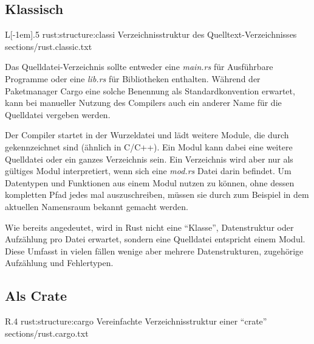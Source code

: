 \subsection{Klassisch}
\label{rust:structure:classic}
\begin{wrapfigure}{L}[-1em]{.5\textwidth}
	\rustcinclude
		{rust:structure:classi}
		{Verzeichnisstruktur des Quelltext-Verzeichnisses}
		{sections/rust.classic.txt}
\end{wrapfigure}

Das Quelldatei-Verzeichnis sollte entweder eine \textit{main.rs} für Ausführbare Programme oder eine \textit{lib.rs} für Bibliotheken enthalten.
Während der Paketmanager Cargo eine solche Benennung als Standardkonvention erwartet, kann bei manueller Nutzung des Compilers auch ein anderer Name für die Quelldatei vergeben werden.

Der Compiler startet in der Wurzeldatei und lädt weitere Module, die durch  gekennzeichnet sind (ähnlich  in C/C++).
Ein Modul kann dabei eine weitere Quelldatei oder ein ganzes Verzeichnis sein.
Ein Verzeichnis wird aber nur als gültiges Modul interpretiert, wenn sich eine \textit{mod.rs} Datei darin befindet.
Um Datentypen und Funktionen aus einem Modul nutzen zu können, ohne dessen kompletten Pfad jedes mal auszuschreiben, müssen sie durch zum Beispiel  in dem aktuellen Namensraum bekannt gemacht werden.

Wie bereits angedeutet, wird in Rust nicht eine \enquote{Klasse}, Datenstruktur oder Aufzählung pro Datei erwartet, sondern eine Quelldatei entspricht einem Modul.
Diese Umfasst in vielen fällen wenige aber mehrere Datenstrukturen, zugehörige Aufzählung und Fehlertypen.

\subsection{Als Crate}
\label{rust:structure:crate}

\begin{wrapfigure}{R}{.4\textwidth}
	\rustcincludeml
		{rust:structure:cargo}
		{Vereinfachte Verzeichnisstruktur einer \enquote{crate}}
		{sections/rust.cargo.txt}
\end{wrapfigure}



